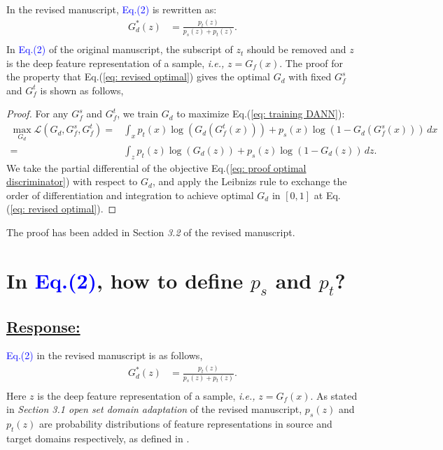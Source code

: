 In the revised manuscript, \textcolor{blue}{Eq.(2)} is rewritten as:
\begin{equation}
    \label{eq: revised optimal}
    \begin{split}
        G_d^*(z) &= \frac{p_t(z)}{p_s(z)+p_t(z)}. \\
    \end{split}
\end{equation}
In \textcolor{blue}{Eq.(2)} of the original manuscript, the subscript of $z_t$ should be removed and $z$ is the deep feature representation of a sample, \textit{i.e.,} $z=G_f(x).$
The proof for the property that Eq.(\ref{eq: revised optimal}) gives the optimal $G_d$ with fixed $G_f^s$ and $G_f^t$ is shown as follows,
\begin{proof}
    For any $G_f^s$ and $G_f^t$, we train $G_d$ to maximize Eq.(\ref{eq: training DANN}):
    \begin{equation}
        \label{eq: proof optimal discriminator}
        \begin{split}
            \max_{G_d} \mathscr{L}(G_d,G^{s}_{f},G_f^t)  = &\int_x p_t(x)\log \left(G_d\left(G_f^t\left(x\right)\right)\right)
              + p_s(x) \log\left(1-G_d\left(G_f^s\left(x\right)\right)\right) \, dx
            \\ = &\int_z p_t(z)\log \left(G_d\left(z\right)\right)
              + p_s(z) \log\left(1-G_d\left(z\right)\right) \, dz.
        \end{split}
    \end{equation}
    We take the partial differential of the objective Eq.(\ref{eq: proof optimal discriminator}) with respect to $G_d$, and apply the Leibnizs rule to exchange the order of differentiation and integration to achieve optimal $G_d$ in $[0, 1]$ at Eq.(\ref{eq: revised optimal}).
\end{proof}

The proof has been added in Section \textit{3.2} of the revised manuscript.

\section{In \textcolor{blue}{Eq.(2)}, how to define $p_s$ and $p_t$?}
\subsection*{\underline{\textbf{Response:}}}

\textcolor{blue}{Eq.(2)} in the revised manuscript is as follows,
\begin{equation}
    \label{eq: revised optimal 1}
    \begin{split}
        G_d^*(z) &= \frac{p_t(z)}{p_s(z)+p_t(z)}. \\
    \end{split}
\end{equation}
Here $z$ is the deep feature representation of a sample, \textit{i.e.,} $z=G_f(x)$.
As stated in \textit{Section 3.1 open set domain adaptation} of the revised manuscript, $p_s (z)$ and $p_t (z)$ are probability distributions of feature representations in source and target domains respectively, as defined in \cite{PartialDA-iw}.

